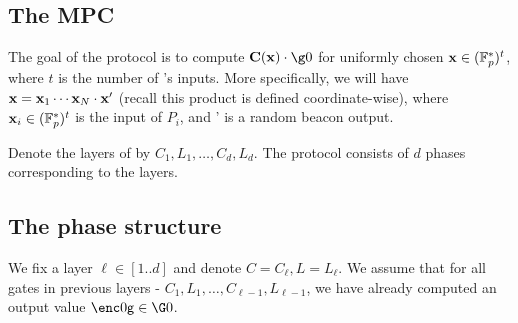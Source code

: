 \documentclass{article}
\begin{document}
\subsection{The MPC}

The goal of the protocol is to compute $\circ(\inp)\cdot \g0$ for uniformly chosen $\mathbf{x}\in ({\mathbb F}_p^*)^t$,
where $t$ is the number of \circ's inputs.
More specifically, we will have $\mathbf{x}=\mathbf{x}_1\cdots\mathbf{x}_N\cdot \mathbf{x}'$ (recall this product is defined coordinate-wise),
where $\mathbf{x}_i\in ({\mathbb F}_p^*)^t$ is the input of $P_i$, and \inp' is a random beacon output.
% 
% 

Denote the layers of \circ by $C_1,L_1,\ldots,C_d,L_d$.
The protocol consists of $d$ phases corresponding to the layers.

 

\subsection{The phase structure}\label{subsec:protocol}

We fix a layer $\ell\in [1..d]$ and denote
$C=C_\ell,L=L_\ell$.
We assume that for all gates \gate in previous layers - $C_1,L_1,\ldots,C_{\ell-1},L_{\ell-1}$,
we have already computed an output value $\enc0{\gate}\in \G0$.
\end{document}
